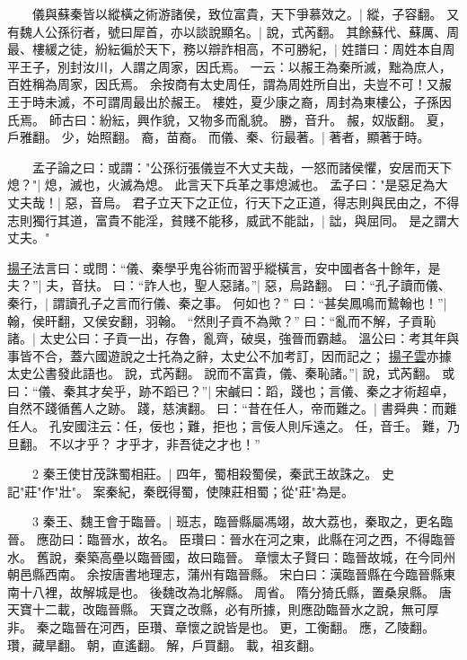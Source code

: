 　　儀與蘇秦皆以縱橫之術游諸侯，致位富貴，天下爭慕效之。|{
	縱，子容翻。
}
又有魏人公孫衍者，號曰犀首，亦以談說顯名。|{
	說，式芮翻。
}
其餘蘇代、蘇厲、周最、樓緩之徒，紛紜徧於天下，務以辯詐相高，不可勝紀，|{
	姓譜曰：周姓本自周平王子，別封汝川，人謂之周家，因氏焉。
	一云：以赧王為秦所滅，黜為庶人，百姓稱為周家，因氏焉。
	余按商有太史周任，謂為周姓所自出，夫豈不可！又赧王于時未滅，不可謂周最出於赧王。
	樓姓，夏少康之裔，周封為東樓公，子孫因氏焉。
	師古曰：紛紜，興作貌，又物多而亂貌。
	勝，音升。
	赧，奴版翻。
	夏，戶雅翻。
	少，始照翻。
	裔，苗裔。
}
而儀、秦、衍最著。|{
	著者，顯著于時。
}

　　孟子論之曰：或謂："公孫衍張儀豈不大丈夫哉，一怒而諸侯懼，安居而天下熄？"|{
	熄，滅也，火滅為熄。
	此言天下兵革之事熄滅也。
}
孟子曰："是惡足為大丈夫哉！|{
	惡，音烏。
}
君子立天下之正位，行天下之正道，得志則與民由之，不得志則獨行其道，富貴不能淫，貧賤不能移，威武不能詘，|{
	詘，與屈同。
}
是之謂大丈夫。"


\underline{揚子}法言曰：或問：“儀、秦學乎鬼谷術而習乎縱橫言，安中國者各十餘年，是夫？”|{
	夫，音扶。
}
曰：“詐人也，聖人惡諸。”|{
	惡，烏路翻。
}
曰：“孔子讀而儀、秦行，|{
	謂讀孔子之言而行儀、秦之事。
}
何如也？”
曰：“甚矣鳳鳴而鷙翰也！”|{
	翰，侯旰翻，又侯安翻，羽翰。
}
“然則子貢不為歟？”
曰：“亂而不解，子貢恥諸。|{
	太史公曰：子貢一出，存魯，亂齊，破吳，強晉而霸越。
	溫公曰：考其年與事皆不合，蓋六國遊說之士托為之辭，太史公不加考訂，因而記之；
	\underline{揚子雲}亦據太史公書發此語也。
	說，式芮翻。
}
說而不富貴，儀、秦恥諸。”|{
	說，式芮翻。
}
或曰：“儀、秦其才矣乎，跡不蹈已？”|{
	宋鹹曰：蹈，踐也；言儀、秦之才術超卓，自然不踐循舊人之跡。
	踐，慈演翻。
}
曰：“昔在任人，帝而難之。|{
	書舜典：而難任人。
	孔安國注云：任，佞也；難，拒也；言佞人則斥遠之。
	任，音壬。
	難，乃旦翻。
}
不以才乎？
才乎才，非吾徒之才也！”

　　2 秦王使甘茂誅蜀相莊。|{
	四年，蜀相殺蜀侯，秦武王故誅之。
	史記"莊"作"壯"。
	案秦紀，秦旣得蜀，使陳莊相蜀；從"莊"為是。
}

　　3 秦王、魏王會于臨晉。|{
	班志，臨晉縣屬馮翊，故大荔也，秦取之，更名臨晉。
	應劭曰：臨晉水，故名。
	臣瓚曰：晉水在河之東，此縣在河之西，不得臨晉水。
	舊說，秦築高壘以臨晉國，故曰臨晉。
	章懷太子賢曰：臨晉故城，在今同州朝邑縣西南。
	余按唐書地理志，蒲州有臨晉縣。
	宋白曰：漢臨晉縣在今臨晉縣東南十八裡，故解城是也。
	後魏改為北解縣。
	周省。
	隋分猗氏縣，置桑泉縣。
	唐天寶十二載，改臨晉縣。
	天寶之改縣，必有所據，則應劭臨晉水之說，無可厚非。
	秦之臨晉在河西，臣瓚、章懷之說皆是也。
	更，工衡翻。
	應，乙陵翻。
	瓚，藏旱翻。
	朝，直遙翻。
	解，戶買翻。
	載，祖亥翻。
}

